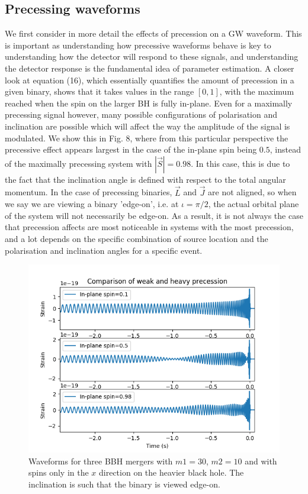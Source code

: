 \documentclass[11pt]{article}
\begin{document}
\subsection{Precessing waveforms}
We first consider in more detail the effects of precession on a GW waveform. This is important as understanding how precessive waveforms behave is key to understanding how the detector will respond to these signals, and understanding the detector response is the fundamental idea of parameter estimation. A closer look at equation (16), which essentially quantifies the amount of precession in a given binary, shows that it takes values in the range $[0,1]$, with the maximum reached when the spin on the larger BH is fully in-plane. Even for a maximally precessing signal however, many possible configurations of polarisation and inclination are possible which will affect the way the amplitude of the signal is modulated. We show this in Fig. 8, where from this particular perspective the precessive effect appears largest in the case of the in-plane spin being $0.5$, instead of the maximally precessing system with $|\vec{S}|=0.98$. In this case, this is due to the fact that the inclination angle is defined with respect to the total angular momentum. In the case of precessing binaries, $\vec{L}$ and $\vec{J}$ are not aligned, so when we say we are viewing a binary 'edge-on', i.e. at $\iota=\pi/2$, the actual orbital plane of the system will not necessarily be edge-on. As a result, it is not always the case that precession affects are most noticeable in systems with the most precession, and a lot depends on the specific combination of source location and the polarisation and inclination angles for a specific event.
\begin{figure}
	\includegraphics[scale=1]{fig8.png}
	\centering
	\caption{Waveforms for three BBH mergers with $m1=30$, $m2=10$ and with spins only in the $x$ direction on the heavier black hole. The inclination is such that the binary is viewed edge-on.}
	\centering
\end{figure}
\end{document}
